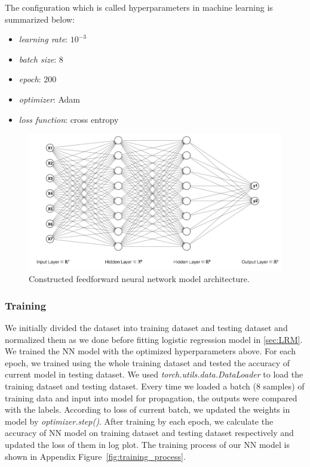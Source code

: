 \documentclass[final-report]{report-template}
\begin{document}
The configuration which is called hyperparameters in machine learning is summarized below:

\begin{itemize}
    \item \textit{learning rate}: $10^{-3}$
    \item \textit{batch size}: 8
    \item \textit{epoch}: 200
    \item \textit{optimizer}: Adam
    \item \textit{loss function}: cross entropy
\end{itemize}

\begin{figure}
    \begin{center}
        \includegraphics[width=1\textwidth]{neural_network_model.png}
    \end{center}
    \caption{\label{fig:neural_network_model} Constructed feedforward neural network model architecture.}
\end{figure}

\subsubsection{Training}
\label{sec:NN_training}
We initially divided the dataset into training dataset and testing dataset and normalized them as we done before fitting logistic regression model in \ref{sec:LRM}.
We trained the NN model with the optimized hyperparameters above.
For each epoch, we trained using the whole training dataset and tested the accuracy of current model in testing dataset.  
We used \textit{torch.utils.data.DataLoader} to load the training dataset and testing dataset.
Every time we loaded a batch (8 samples) of training data and input into model for propagation, the outputs were compared with the labels. 
According to loss of current batch, we updated the weights in model by \textit{optimizer.step()}.
After training by each epoch, we calculate the accuracy of NN model on training dataset and testing dataset respectively and updated the loss of them in log plot. 
The training process of our NN model is shown in Appendix Figure~\ref{fig:training_process}.
\end{document}
